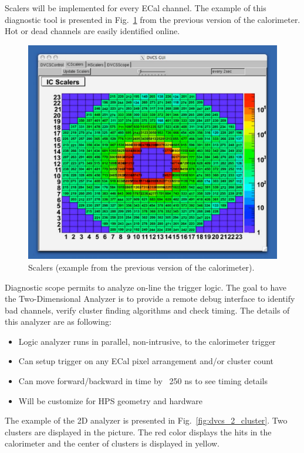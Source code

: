 Scalers will be implemented for every ECal channel. The example of this diagnostic tool is presented in Fig.~\ref{fig:dvcs_beam}
from the previous version of the calorimeter. Hot or dead channels are easily identified online.
\begin{figure}[h]
\includegraphics[scale=0.52]{daq_trigger/figures/dvcs_beam}
\caption{\small{Scalers (example from the previous version of the calorimeter).}}
\label{fig:dvcs_beam}
\end{figure}
Diagnostic scope permits to analyze on-line  the trigger logic. The goal to have  the Two-Dimensional Analyzer
 is to provide a remote debug interface to identify bad channels, verify cluster finding algorithms and check timing.
 The details of this analyzer are as following:
 
\begin{itemize}
\item Logic analyzer runs in parallel, non-intrusive, to the calorimeter trigger
\item Can setup trigger on any ECal pixel arrangement and/or cluster count
\item Can move forward/backward in time by ~250 ns to see timing details
\item Will be customize for HPS geometry and hardware
\end{itemize}

The example of the 2D analyzer is presented in Fig.~\ref{fig:dvcs_2_cluster}. Two clusters are displayed
in the picture. The red color displays the hits in the calorimeter and  the center of clusters is displayed in yellow.

